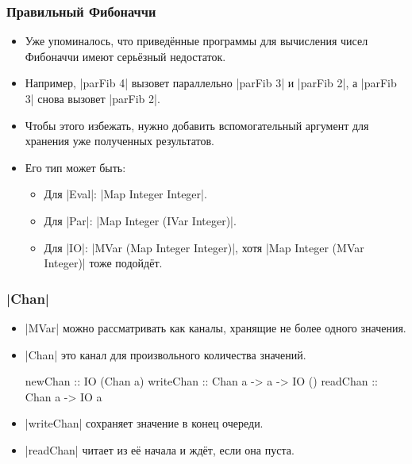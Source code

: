 \documentclass[11pt]{beamer}
\begin{document}
\begin{frame}[fragile]
  \frametitle{Правильный Фибоначчи}
  \begin{itemize}
    \item Уже упоминалось, что приведённые программы для вычисления чисел Фибоначчи имеют серьёзный недостаток.
    \item Например, \haskinline|parFib 4| вызовет параллельно \haskinline|parFib 3| и \haskinline|parFib 2|, а \haskinline|parFib 3| снова вызовет \haskinline|parFib 2|.
    \item Чтобы этого избежать, нужно добавить вспомогательный аргумент для хранения уже полученных результатов.
    \item Его тип может быть:
          \begin{itemize}
            \item Для \haskinline|Eval|: \haskinline|Map Integer Integer|.
            \item Для \haskinline|Par|: \haskinline|Map Integer (IVar Integer)|.
            \item Для \haskinline|IO|: \haskinline|MVar (Map Integer Integer)|, хотя \haskinline|Map Integer (MVar Integer)| тоже подойдёт.
          \end{itemize}
  \end{itemize}
\end{frame}

\begin{frame}[fragile]
  \frametitle{\haskinline|Chan|}
  \begin{itemize}
    \item \haskinline|MVar| можно рассматривать как каналы, хранящие не более одного значения.
    \item \haskinline|Chan| это канал для произвольного количества значений.
          \begin{haskell}
        newChan :: IO (Chan a)
        writeChan :: Chan a -> a -> IO () 
        readChan :: Chan a -> IO a
    \end{haskell}
    \item \haskinline|writeChan| сохраняет значение в конец очереди.
    \item \haskinline|readChan| читает из её начала и ждёт, если она пуста.
  \end{itemize}
\end{frame}
\end{document}
